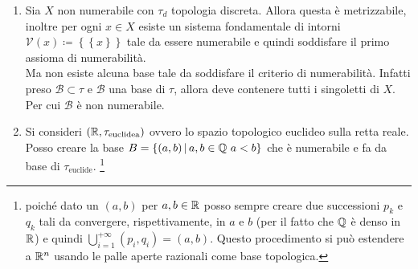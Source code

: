 \begin{example}	
\begin{enumerate}
	\item Sia $X$ non numerabile con $\tau_d$ topologia discreta. Allora questa è metrizzabile, inoltre per ogni $x\in X$ esiste un sistema fondamentale di intorni $\mathcal{V}(x) \coloneqq \left\{ \left\{x \right\} \right\}$ tale da essere numerabile e quindi soddisfare il primo assioma di numerabilità. \\ Ma non esiste alcuna base tale da soddisfare il  criterio di numerabilità. Infatti preso $\mathcal{B} \subset \tau$ e $\mathcal{B}$ una base di $\tau$, allora deve contenere tutti i singoletti di $X$. Per cui $\mathcal{B}$ è non numerabile.
	\item Si consideri $(\mathbb{R}, \tau_{\text{euclidea}})$ ovvero lo spazio topologico euclideo sulla retta reale. Posso creare la base $B = \left\{(a,b) \,\middle|\, a,b \in \mathbb{Q}\ a < b\right\}$  che è numerabile e fa da base di $\tau_{\text{euclide}}$. \footnote{poiché dato un $(a,b)$ per $a,b \in \mathbb{R}$ posso sempre creare due successioni $p_k$ e $q_k$ tali da convergere, rispettivamente, in $a$ e $b$  (per il fatto che $\mathbb{Q}$ è denso in $\mathbb{R}$) e quindi $\bigcup_{i=1}^{+\infty}(p_i, q_i) = (a,b)$. Questo procedimento si può estendere a $\mathbb{R}^n$ usando le palle aperte razionali come base topologica.}
\end{enumerate}
\end{example}


